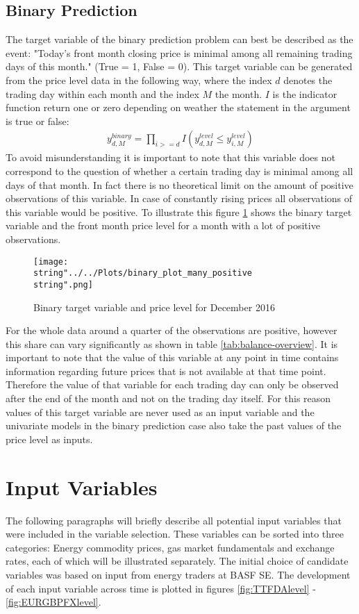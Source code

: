 \subsection{Binary Prediction}
The target variable of the binary prediction problem can best be described as the event: "Today's front month closing price is minimal among all remaining trading days of this month." (True = 1, False = 0). This target variable can be generated from the price level data in the following way, where the index $d$ denotes the trading day within each month and the index $M$ the month. $I$ is the indicator function return one or zero depending on weather the statement in the argument is true or false:
\begin{align*}
y_{d,M}^{binary} = \prod_{i >= d} I(y_{d,M}^{level} \leq y_{i,M}^{level})
\end{align*}
To avoid misunderstanding it is important to note that this variable does not correspond to the question of whether a certain trading day is minimal among all days of that month. In fact there is no theoretical limit on the amount of positive observations of this variable. 
In case of constantly rising prices all observations of this variable would be positive.
To illustrate this figure \ref{fig:binary_plot_many_positive} shows the binary target variable and the front month price level for a month with a lot of positive observations.
\begin{figure}[h!]
  \centering
\texttt{[image: \\string"../../Plots/binary\_plot\_many\_positive\\string".png]}
  \caption{Binary target variable and price level for December 2016}\label{fig:binary_plot_many_positive}
\end{figure}
For the whole data around a quarter of the observations are positive, however this share can vary significantly as shown in table \ref{tab:balance-overview}. It is important to note that the value of this variable at any point in time contains information regarding future prices that is not available at that time point. Therefore the value of that variable for each trading day can only be observed after the end of the month and not on the trading day itself. For this reason values of this target variable are never used as an input variable and the univariate models in the binary prediction case also take the past values of the price level as inputs.

\section{Input Variables}\label{Sec:Input}
The following paragraphs will briefly describe all potential input variables that were included in the variable selection. These variables can be sorted into three categories: Energy commodity prices, gas market fundamentals and exchange rates, each of which will be illustrated separately. The initial choice of candidate variables was based on input from energy traders at BASF SE. The development of each input variable across time is plotted in figures  \ref{fig:TTFDAlevel} - \ref{fig:EURGBPFXlevel}.
